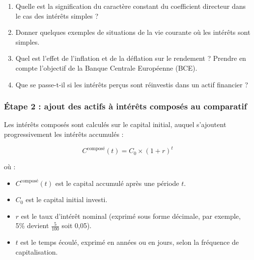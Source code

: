 \documentclass{article}
\begin{document}
\begin{enumerate}[label=\textbf{Q1.\arabic*}]
                \item Quelle est la signification du caractère constant du coefficient directeur dans le cas des intérêts simples ?

                \item Donner quelques exemples de situations de la vie courante où les intérêts sont simples.

                \item Quel est l'effet de l'inflation et de la déflation sur le rendement ? Prendre en compte l'objectif de la Banque Centrale Européenne (BCE).

                \item Que se passe-t-il si les intérêts perçus sont réinvestis dans un actif financier ?
            \end{enumerate}

        \subsubsection*{Étape 2 : ajout des actifs à intérêts composés au comparatif}
            \begin{tcolorbox}[
                colback=lightgreen, 
                colframe=lightgreen, 
                boxrule=0.5pt, 
                arc=0pt, 
                left=10pt, 
                right=10pt, 
                top=6pt, 
                bottom=6pt, 
                boxsep=2pt, 
                before upper={\faLightbulb\hspace{10pt}}
            ]
                Les intérêts composés sont calculés sur le capital initial, auquel s'ajoutent progressivement les intérêts accumulés :

                \[
                C^{\text{composé}}(t) = C_0 \times (1 + r)^t
                \]

                où :
                \begin{itemize}
                    \item \( C^{\text{composé}}(t) \) est le capital accumulé après une période \( t \).
                    \item \( C_0 \) est le capital initial investi.
                    \item \( r \) est le taux d'intérêt nominal (exprimé sous forme décimale, par exemple, 5\% devient $\frac{5}{100}$ soit 0,05).
                    \item \( t \) est le temps écoulé, exprimé en années ou en jours, selon la fréquence de capitalisation.
                \end{itemize}
            \end{tcolorbox}
\end{document}
